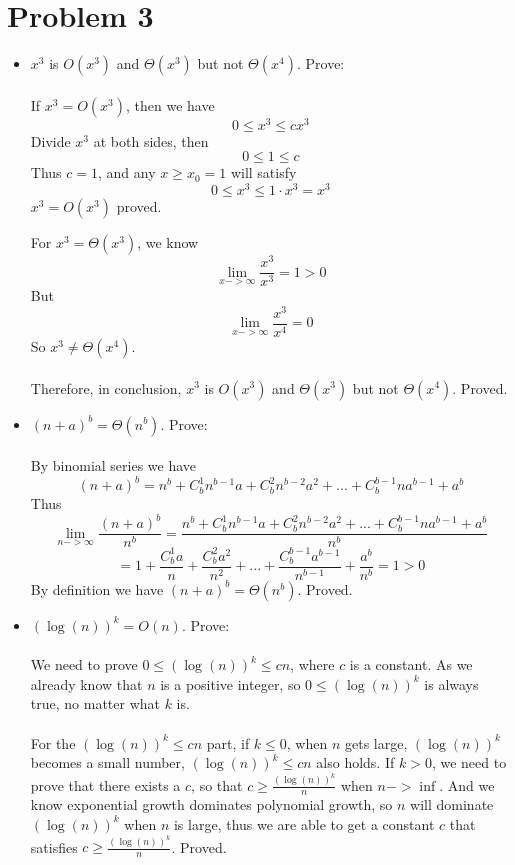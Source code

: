 \section*{Problem 3}
\begin{itemize}
\item $x^3$ is $O(x^3)$ and $\Theta (x^3)$ but not $\Theta (x^4)$. Prove:\\\\
If $x^3 = O(x^3)$, then we have 
\[
0 \leq x^3 \leq cx^3
\]
Divide $x^3$ at both sides, then 
\[
0 \leq 1 \leq c
\]
Thus $c = 1$, and any $x \geq x_0 = 1$ will satisfy 
\[
0 \leq x^3 \leq 1 \cdot x^3 = x^3
\]
$x^3 = O(x^3)$ proved. 

For $x^3 = \Theta(x^3)$, we know 
\[
\lim_{x->\infty} \frac{x^3}{x^3} = 1 > 0 
\]
But 
\[
\lim_{x->\infty} \frac{x^3}{x^4} = 0 
\]
So $x^3 \neq \Theta(x^4)$. \\\\
Therefore, in conclusion, $x^3$ is $O(x^3)$ and $\Theta (x^3)$ but not $\Theta (x^4)$. Proved. \\

\item $(n + a)^b = \Theta(n^b)$. Prove:\\\\
By binomial series we have 
\[
(n + a)^b = n^b + C_b^1n^{b-1}a + C_b^2n^{b-2}a^2 + ... + C_b^{b-1}na^{b-1} + a^b 
\]
Thus 
\[
\lim_{n->\infty} \frac{(n + a)^b}{n^b} 
= \frac{n^b + C_b^1n^{b-1}a + C_b^2n^{b-2}a^2 + ... + C_b^{b-1}na^{b-1} + a^b }{n^b} 
\]
\[= 1 + \frac{C_b^1a}{n} + \frac{C_b^2a^2}{n^2} + ... + \frac{C_b^{b-1}a^{b-1}}{n^{b-1}} + \frac{a^b}{n^b} 
= 1 > 0
\]
By definition we have $(n + a)^b = \Theta(n^b)$. Proved. \\


\item $(\log(n))^k = O(n)$. Prove:\\\\
We need to prove $0 \leq (\log(n))^k \leq cn$, where $c$ is a constant. As we already know that $n$ is a positive integer, so $0 \leq (\log(n))^k$ is always true, no matter what $k$ is. \\\\
For the $(\log(n))^k \leq cn$ part, if $k \leq 0$, when $n$ gets large, $(\log(n))^k$ becomes a small number, $(\log(n))^k \leq cn$ also holds. If $k > 0$, we need to prove that there exists a $c$, so that $c \geq \frac{(\log(n))^k}{n}$ when $n->\inf$. And we know exponential growth dominates polynomial growth, so $n$ will dominate $(\log(n))^k$ when $n$ is large, thus we are able to get a constant $c$ that satisfies $c \geq \frac{(\log(n))^k}{n}$. Proved. \\




\end{itemize}
